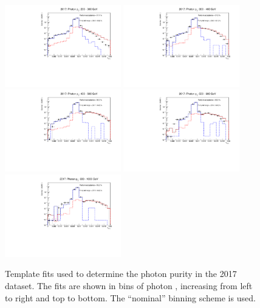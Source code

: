 \begin{figure}[htbp]
    \centering
        \includegraphics[width=0.45\textwidth]{PhotonPurity/fit_2017_pt200-300_nominal.pdf}
        \includegraphics[width=0.45\textwidth]{PhotonPurity/fit_2017_pt300-400_nominal.pdf}
        \includegraphics[width=0.45\textwidth]{PhotonPurity/fit_2017_pt400-500_nominal.pdf}
        \includegraphics[width=0.45\textwidth]{PhotonPurity/fit_2017_pt500-600_nominal.pdf}
        \includegraphics[width=0.45\textwidth]{PhotonPurity/fit_2017_pt600-1000_nominal.pdf}
    \caption{Template fits used to determine the photon purity in the 2017 dataset. The fits are shown in bins of photon \pt, increasing from left 
    to right and top to bottom. The ``nominal'' binning scheme is used.}
    \label{fig:purity_fits_2017}
\end{figure}

